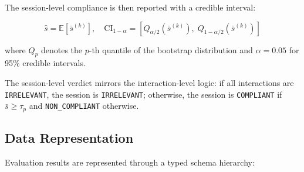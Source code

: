 \documentclass[11pt]{article}
\begin{document}
The session-level compliance is then reported with a credible interval:

\begin{equation}
    \hat{s} = \mathbb{E}[\bar{s}^{(k)}], \quad \text{CI}_{1-\alpha} = \left[ Q_{\alpha/2}(\bar{s}^{(k)}), \; Q_{1-\alpha/2}(\bar{s}^{(k)}) \right]
\end{equation}

where $Q_p$ denotes the $p$-th quantile of the bootstrap distribution and $\alpha = 0.05$ for 95\% credible intervals.

The session-level verdict mirrors the interaction-level logic: if all interactions are \texttt{IRRELEVANT}, the session is \texttt{IRRELEVANT}; otherwise, the session is \texttt{COMPLIANT} if $\bar{s} \geq \tau_p$ and \texttt{NON\_COMPLIANT} otherwise.

\subsection{Data Representation}

Evaluation results are represented through a typed schema hierarchy:
\end{document}
